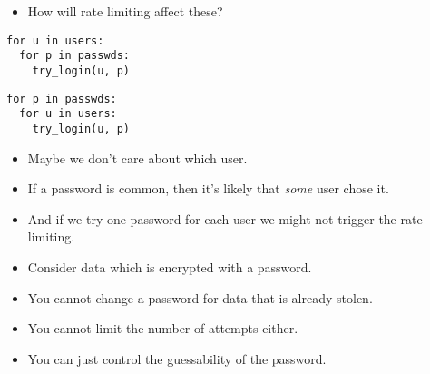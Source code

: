\begin{frame}[fragile]
  \begin{exercise}
    \begin{itemize}
      \item How will rate limiting affect these?
    \end{itemize}

    \begin{minipage}{0.45\textwidth}
      \begin{lstlisting}
for u in users:
  for p in passwds:
    try_login(u, p)
      \end{lstlisting}
    \end{minipage}
    \hfill
    \begin{minipage}{0.45\textwidth}
      \begin{lstlisting}
for p in passwds:
  for u in users:
    try_login(u, p)
      \end{lstlisting}
    \end{minipage}
  \end{exercise}
\end{frame}

\begin{frame}
  \begin{remark}
    \begin{itemize}
      \item Maybe we don't care about which user.
      \item If a password is common, then it's likely that \emph{some} user 
        chose it.
      \item And if we try one password for each user we might not trigger the 
        rate limiting.
    \end{itemize}
  \end{remark}
\end{frame}

\begin{frame}
  \begin{remark}[Offline]
    \begin{itemize}
      \item Consider data which is encrypted with a password.
      \item You cannot change a password for data that is already stolen.
      \item You cannot limit the number of attempts either.
      \item You can just control the guessability of the password.
    \end{itemize}
  \end{remark}
\end{frame}

